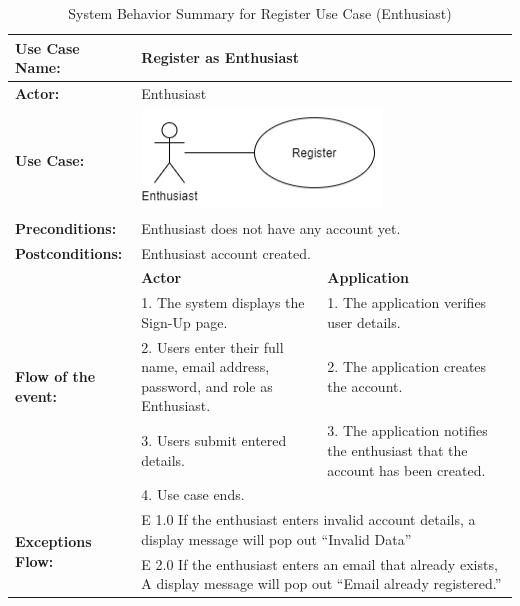 \begin{longtable}{|p{3cm}|p{5cm}|p{5cm}|}
    \caption{\centering System Behavior Summary for Register Use Case (Enthusiast)} \\
    \hline
    \textbf{Use Case Name:} & \multicolumn{2}{l|}{Register as Enthusiast} \\ \hline
    \textbf{Actor:} & \multicolumn{2}{l|}{Enthusiast} \\ \hline
    \textbf{Use Case:} & \multicolumn{2}{l|}{\includegraphics[width=0.5\linewidth]{mainmatter/images/sucd7.png}} \\ \hline
    \textbf{Preconditions:} & \multicolumn{2}{p{10cm}|}{Enthusiast does not have any account yet.} \\ \hline
    \textbf{Postconditions:} & \multicolumn{2}{p{10cm}|}{Enthusiast account created.} \\ \hline
    \multirow{5}{3cm}{\raggedright \textbf{Flow of the event:}} & \textbf{Actor} & \textbf{Application} \\ \cline{2-3}
    & 1. The system displays the Sign-Up page. & 1. The application verifies user details. \\ \cline{2-3}
    & 2. Users enter their full name, email address, password, and role as Enthusiast. & 2. The application creates the account.  \\ \cline{2-3}
    & 3. Users submit entered details. & 3. The application notifies the enthusiast that the account has been created.  \\ \cline{2-3}
    & 4. Use case ends. &  \\ \hline
    \multirow{2}{3cm}{\raggedright \textbf{Exceptions Flow:}} 
    & \multicolumn{2}{p{10cm}|}{\raggedright E 1.0 If the enthusiast enters invalid account details, a display message will pop out “Invalid Data”} \\ \cline{2-3}
    & \multicolumn{2}{p{10cm}|}{\raggedright E 2.0 If the enthusiast enters an email that already exists, A display message will pop out “Email already registered.”} \\ \hline
\end{longtable}
\pagebreak

